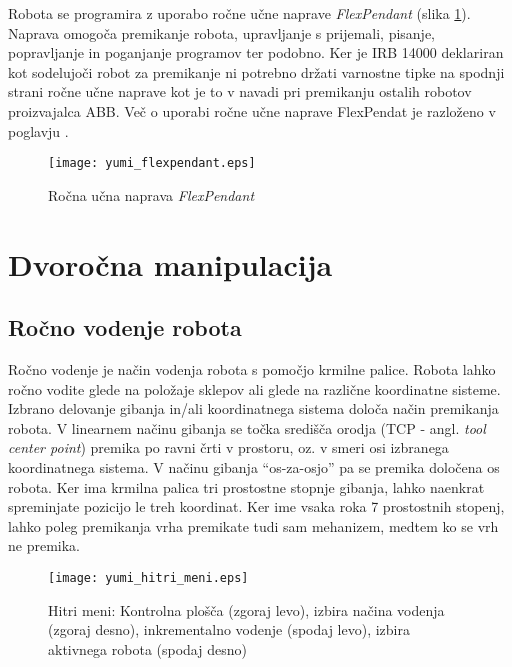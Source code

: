 Robota se programira z uporabo ročne učne naprave \emph{FlexPendant} (slika \ref{fig:yumi_flexpendant}). Naprava omogoča premikanje robota, upravljanje s prijemali, pisanje, popravljanje in poganjanje programov ter podobno. Ker je IRB 14000 deklariran kot sodelujoči robot za premikanje ni potrebno držati varnostne tipke na spodnji strani ročne učne naprave kot je to v navadi pri premikanju ostalih robotov proizvajalca ABB. Več o uporabi ročne učne naprave FlexPendat je razloženo v poglavju  \label{Pog:ABB}.


\begin{figure}[!hbt]
	\centering
	\texttt{[image: yumi\_flexpendant.eps]}
	\caption{Ročna učna naprava \emph{FlexPendant}}
	\label{fig:yumi_flexpendant}
\end{figure}


\section{Dvoročna manipulacija}


\subsection{Ročno vodenje robota}

Ročno vodenje je način vodenja robota s pomočjo krmilne palice. Robota lahko ročno vodite glede na položaje sklepov ali glede na različne koordinatne sisteme. Izbrano delovanje gibanja in/ali koordinatnega sistema določa način premikanja robota. V linearnem načinu gibanja se točka središča orodja (TCP - angl. \emph{tool center point}) premika po ravni črti v prostoru, oz. v smeri osi izbranega koordinatnega sistema. V načinu gibanja ``os-za-osjo'' pa se premika določena os robota. Ker ima krmilna palica tri prostostne stopnje gibanja, lahko naenkrat spreminjate pozicijo le treh koordinat. Ker ime vsaka roka 7 prostostnih stopenj, lahko poleg premikanja vrha premikate tudi sam mehanizem, medtem ko se vrh ne premika.

\begin{figure}[!hbt]
	\centering
	\texttt{[image: yumi\_hitri\_meni.eps]}
	\caption{Hitri meni: Kontrolna plošča (zgoraj levo), izbira načina vodenja (zgoraj desno), inkrementalno vodenje (spodaj levo), izbira aktivnega robota (spodaj desno)}
	\label{fig:yumi_hitri}
\end{figure}


